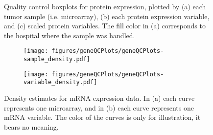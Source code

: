 \begin{figure}
	\centering
	\begin{subfigure}{1\textwidth}
		\centering
	\end{subfigure}
	\begin{subfigure}{1\textwidth}
		\centering
	\end{subfigure}
	\begin{subfigure}{1\textwidth}
		\centering
	\end{subfigure}

	\caption{Quality control boxplots for protein expression, plotted by
	(a) each tumor sample (i.e. microarray),
	(b) each protein expression variable, 
	and (c) scaled protein variables.
	The fill color in (a) corresponds to the hospital where the sample was handled.}
	\label{fig:qc-mrna-boxplot}
\end{figure}


\begin{figure}[!h]
	\centering
	\begin{subfigure}{.45\textwidth}
		\centering
		\texttt{[image: figures/geneQCPlots/geneQCPlots-sample\_density.pdf]}
	\end{subfigure}
	\begin{subfigure}{.45\textwidth}
		\centering
		\texttt{[image: figures/geneQCPlots/geneQCPlots-variable\_density.pdf]}
	\end{subfigure}

	\caption{Density estimates for mRNA expression data. In (a) each curve represents one microarray,
	and in (b) each curve represents one mRNA variable. The color of the curves is only for illustration,
	it bears no meaning.}
	\label{fig:qc-mrna-density}
\end{figure}


